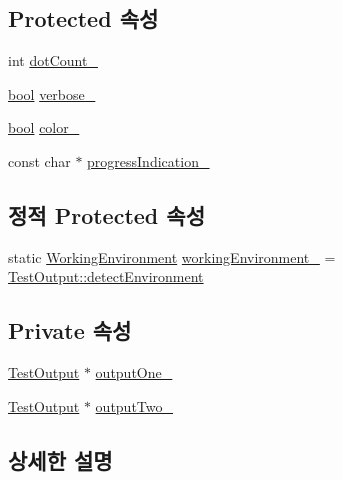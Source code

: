 \subsection*{Protected 속성}
\begin{DoxyCompactItemize}
\item 
int \hyperlink{class_test_output_a3c1c7e8cf0310d384198f0dc504251c6}{dot\+Count\+\_\+}
\item 
\hyperlink{avb__gptp_8h_af6a258d8f3ee5206d682d799316314b1}{bool} \hyperlink{class_test_output_a86126da532c138842a42d8e9a52b0806}{verbose\+\_\+}
\item 
\hyperlink{avb__gptp_8h_af6a258d8f3ee5206d682d799316314b1}{bool} \hyperlink{class_test_output_adda8c1875964c3b80ed1c77b585fc756}{color\+\_\+}
\item 
const char $\ast$ \hyperlink{class_test_output_a4cbc8ea3886624399ab3879767d4f018}{progress\+Indication\+\_\+}
\end{DoxyCompactItemize}
\subsection*{정적 Protected 속성}
\begin{DoxyCompactItemize}
\item 
static \hyperlink{class_test_output_a0541851f863713454486a9fb3080f766}{Working\+Environment} \hyperlink{class_test_output_a8b622cfce4b95599cd31b61a777d68ef}{working\+Environment\+\_\+} = \hyperlink{class_test_output_a0541851f863713454486a9fb3080f766a3f11f791db94db142e33c3c75442ed10}{Test\+Output\+::detect\+Environment}
\end{DoxyCompactItemize}
\subsection*{Private 속성}
\begin{DoxyCompactItemize}
\item 
\hyperlink{class_test_output}{Test\+Output} $\ast$ \hyperlink{class_composite_test_output_ac3af974ee10b6d7e656ce6675df648ec}{output\+One\+\_\+}
\item 
\hyperlink{class_test_output}{Test\+Output} $\ast$ \hyperlink{class_composite_test_output_a7bc3ab8c546a0435d0e8f46b12245883}{output\+Two\+\_\+}
\end{DoxyCompactItemize}


\subsection{상세한 설명}


